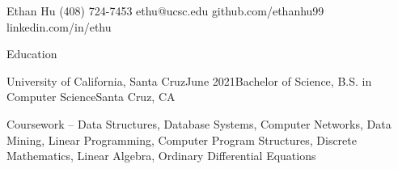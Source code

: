 \documentclass[11pt]{cv_template}
\begin{document}

\begin{cv}

\begin{cvheader}
{Ethan Hu}
{(408) 724-7453}
{ethu@ucsc.edu}
{github.com/ethanhu99}
{}
{linkedin.com/in/ethu}
\end{cvheader}






\begin{cvsection}{Education}


\begin{cvsubsection}
{University of California, Santa Cruz}{June 2021}{Bachelor of Science, B.S. in Computer Science}{Santa Cruz, CA}

\listitem[] Coursework -- Data Structures, Database Systems, Computer Networks, Data Mining, Linear Programming, Computer Program Structures, Discrete Mathematics, Linear Algebra, Ordinary Differential Equations

\end{cvsubsection}

\end{cvsection}



\end{cv}
\end{document}
